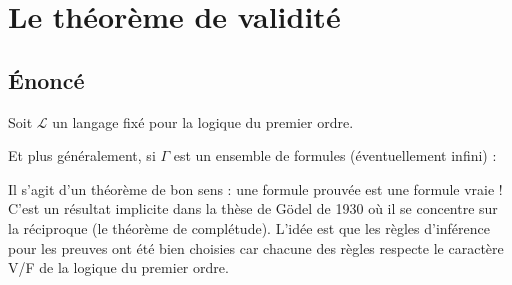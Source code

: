 \documentclass[11pt,class=report,crop=false]{standalone}
\begin{document}







\section{Le théorème de validité}

\subsection{Énoncé}

Soit $\mathcal{L}$ un langage fixé pour la logique du premier ordre.

\begin{theoreme}
	\sauteligne
{}
\end{theoreme}

Et plus généralement, si $\Gamma$ est un ensemble de formules (éventuellement infini) :

Il s'agit d'un théorème de bon sens : une formule prouvée est une formule vraie ! 
C'est un résultat implicite dans la thèse de Gödel de 1930 où il se concentre sur la réciproque (le théorème de complétude).
L'idée est que les règles d'inférence pour les preuves ont été bien choisies car chacune des règles respecte le caractère V/F de la logique du premier ordre.

\end{document}
